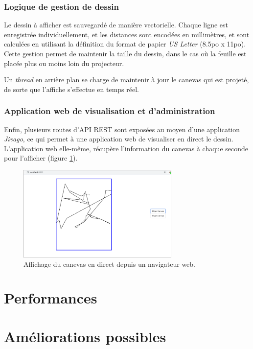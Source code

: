 \documentclass[11pt]{report}
\begin{document}

\subsubsection{Logique de gestion de dessin}

Le dessin à afficher est sauvegardé de manière vectorielle. Chaque ligne est
enregistrée individuellement, et les distances sont encodées en millimètres, et
sont calculées en utilisant la définition du format de papier \textit{US
  Letter} (8.5po x 11po). Cette gestion permet de maintenir la taille du dessin,
dans le cas où la feuille est placée plus ou moins loin du projecteur.

Un \textit{thread} en arrière plan se charge de maintenir à jour le canevas qui
est projeté, de sorte que l'affiche s'effectue en temps réel. 

\subsubsection{Application web de visualisation et d'administration}

Enfin, plusieurs routes d'API REST sont exposées au moyen d'une application
\textit{Jivago}, ce qui permet à une application web de visualiser en direct le
dessin. L'application web elle-même, récupère l'information du canevas à chaque
seconde pour l'afficher (figure \ref{web_ui}). 

\begin{figure}
  \centering
  \includegraphics[width=8cm]{web-canvas.png}
  \caption{Affichage du canevas en direct depuis un navigateur web.}
  \label{web_ui}
  \end{figure}

\section{Performances}

\section{Améliorations possibles}
\end{document}
